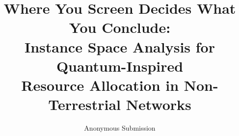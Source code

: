 \documentclass[runningheads]{llncs}
\begin{document}
\title{\texorpdfstring{Where You Screen Decides What You Conclude:\\
Instance Space Analysis for Quantum-Inspired\\ Resource Allocation in Non-Terrestrial
Networks}{Where You Screen Decides What You Conclude: Instance Space Analysis for
Quantum-Inspired Resource Allocation in Non-Terrestrial Networks}}

\author{Anonymous Submission}

\maketitle
\end{document}
